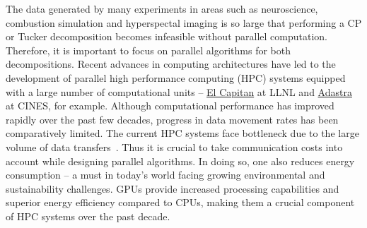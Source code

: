 \documentclass[a4paper,11pt, margin=2cm]{article}
\newcommand{\bora}[1]{{\color{magenta} \emph{#1}}}
\begin{document}
	
	The data generated by many experiments in areas such as neuroscience, combustion simulation and hyperspectal imaging is so large that performing a CP or Tucker decomposition becomes infeasible without parallel computation.
	Therefore, it is important to focus on parallel algorithms for both decompositions.
	Recent advances in computing architectures have led to the development of parallel high performance computing (HPC) systems equipped with a large number of computational units 
	-- \href{https://asc.llnl.gov/exascale/el-capitan}{El Capitan} at LLNL and \href{https://dci.dci-gitlab.cines.fr/webextranet/architecture}{Adastra} at CINES, for example.
	Although computational performance has improved rapidly over the past few decades, progress in data movement rates has been comparatively limited.
	The current HPC systems face bottleneck due to the large volume of data transfers~\cite{DOE-Report-2014}. Thus it is crucial to take communication costs into account while designing parallel algorithms. In doing so, one also reduces energy consumption -- a must in today’s world facing growing environmental and sustainability challenges.
	GPUs provide increased processing capabilities and superior energy efficiency compared to CPUs, making them a crucial component of HPC systems over the past decade.
\end{document}
